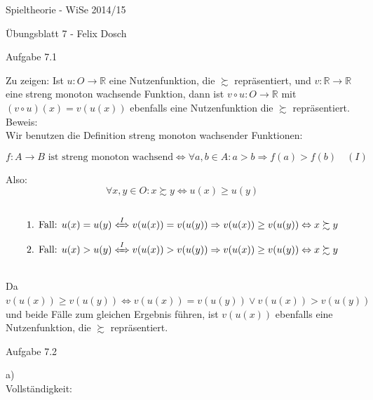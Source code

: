\documentclass{scrartcl}
\begin{document}
\begin{LARGE}
Spieltheorie - WiSe 2014/15
\end{LARGE}

\begin{Large}
Übungsblatt 7 - Felix Dosch\\[1.0cm]
\end{Large}

\begin{Large}
Aufgabe 7.1\\[0.0cm]
\end{Large}

Zu zeigen: Ist $u : O \rightarrow \mathbb{R}$ eine Nutzenfunktion, die $\succsim$ repräsentiert, und 
$v : \mathbb{R} \rightarrow \mathbb{R}$ eine streng monoton wachsende Funktion, dann ist $v \circ
u : O \rightarrow \mathbb{R}$ mit $(v \circ u)(x) = v(u(x))$ ebenfalls eine Nutzenfunktion die
$\succsim$ repräsentiert.\\

Beweis:\\

Wir benutzen die Definition streng monoton wachsender Funktionen:

\[
f : A \rightarrow B \text{ ist streng monoton wachsend} \Leftrightarrow \forall a, b \in A : a > b
\Rightarrow f(a) > f(b)  \quad (I)
\]

Also: \\

\[
\forall x, y \in O: x \succsim y \Leftrightarrow u(x) \geq u(y)
\] \\
\[
\text{1. Fall: } u(x) = u(y) \xLeftrightarrow{I} v(u(x)) = v(u(y))  \Rightarrow v(u(x)) \geq v(u(y))
\Leftrightarrow x \succsim y
\]
\[
\text{2. Fall: } u(x) > u(y) \xLeftrightarrow{I} v(u(x)) > v(u(y)) \Rightarrow v(u(x)) \geq v(u(y))
\Leftrightarrow x \succsim y
\] \\

Da $v(u(x)) \geq v(u(y)) \Leftrightarrow v(u(x)) = v(u(y)) \vee v(u(x)) > v(u(y))$ und beide Fälle zum
gleichen Ergebnis führen, ist $v(u(x))$ ebenfalls eine Nutzenfunktion, die $\succsim$ repräsentiert. \\

\begin{Large}
Aufgabe 7.2\\[0.0cm]
\end{Large}

a) \\

Vollständigkeit: \\
\end{document}
